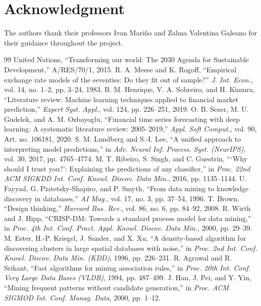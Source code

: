 \documentclass[conference]{IEEEtran}
\begin{document}
\section*{Acknowledgment}
The authors thank their professors Ivan Mariño and Zalma Valentina Galeano for their guidance throughout the project.

\begin{thebibliography}{99}
 United Nations, ``Transforming our world: The 2030 Agenda for Sustainable Development,'' A/RES/70/1, 2015.
 R. A. Meese and K. Rogoff, ``Empirical exchange rate models of the seventies: Do they fit out of sample?'' \emph{J. Int. Econ.}, vol. 14, no. 1--2, pp. 3--24, 1983.
 B. M. Henrique, V. A. Sobreiro, and H. Kimura, ``Literature review: Machine learning techniques applied to financial market prediction,'' \emph{Expert Syst. Appl.}, vol. 124, pp. 226--251, 2019.
 O. B. Sezer, M. U. Gudelek, and A. M. Ozbayoglu, ``Financial time series forecasting with deep learning: A systematic literature review: 2005--2019,'' \emph{Appl. Soft Comput.}, vol. 90, Art. no. 106181, 2020.
 S. M. Lundberg and S.-I. Lee, ``A unified approach to interpreting model predictions,'' in \emph{Adv. Neural Inf. Process. Syst. (NeurIPS)}, vol. 30, 2017, pp. 4765--4774.
 M. T. Ribeiro, S. Singh, and C. Guestrin, ```Why should I trust you?': Explaining the predictions of any classifier,'' in \emph{Proc. 22nd ACM SIGKDD Int. Conf. Knowl. Discov. Data Min.}, 2016, pp. 1135--1144.
 U. Fayyad, G. Piatetsky-Shapiro, and P. Smyth, ``From data mining to knowledge discovery in databases,'' \emph{AI Mag.}, vol. 17, no. 3, pp. 37--54, 1996.
 T. Brown, ``Design thinking,'' \emph{Harvard Bus. Rev.}, vol. 86, no. 6, pp. 84--92, 2008.
 R. Wirth and J. Hipp, ``CRISP-DM: Towards a standard process model for data mining,'' in \emph{Proc. 4th Int. Conf. Pract. Appl. Knowl. Discov. Data Min.}, 2000, pp. 29--39.
 M. Ester, H.-P. Kriegel, J. Sander, and X. Xu, ``A density-based algorithm for discovering clusters in large spatial databases with noise,'' in \emph{Proc. 2nd Int. Conf. Knowl. Discov. Data Min. (KDD)}, 1996, pp. 226--231.
 R. Agrawal and R. Srikant, ``Fast algorithms for mining association rules,'' in \emph{Proc. 20th Int. Conf. Very Large Data Bases (VLDB)}, 1994, pp. 487--499.
 J. Han, J. Pei, and Y. Yin, ``Mining frequent patterns without candidate generation,'' in \emph{Proc. ACM SIGMOD Int. Conf. Manag. Data}, 2000, pp. 1--12.

\end{thebibliography}
\end{document}
